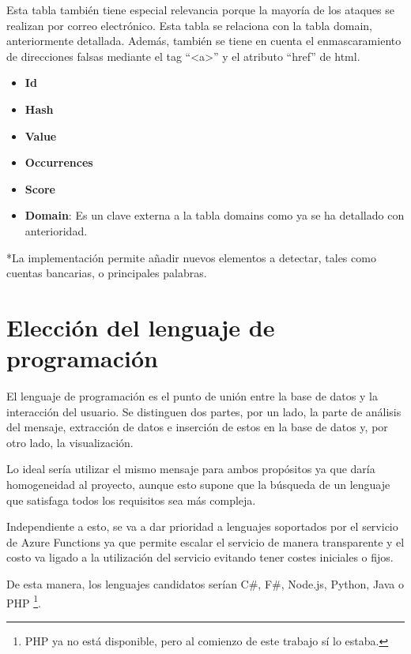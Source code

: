 \begin{itemize}
Esta tabla también tiene especial relevancia porque la mayoría de los ataques se realizan por correo electrónico. Esta tabla se relaciona con la tabla domain, anteriormente detallada. Además, también se tiene en cuenta el enmascaramiento de direcciones falsas mediante el tag “<a>” y el atributo “href” de html.
\begin{itemize}
    \item \textbf{Id}
    \item \textbf{Hash}
    \item \textbf{Value}
    \item \textbf{Occurrences}
    \item \textbf{Score}
    \item \textbf{Domain}: Es un clave externa a la tabla domains como ya se ha detallado con anterioridad.
\end{itemize}

\end{itemize}
*La implementación permite añadir nuevos elementos a detectar, tales como cuentas bancarias, o principales palabras.

\section{Elección del lenguaje de programación}
El lenguaje de programación es el punto de unión entre la base de datos y la interacción del usuario. Se distinguen dos partes, por un lado, la parte de análisis del mensaje, extracción de datos e inserción de estos en la base de datos y, por otro lado, la visualización.

Lo ideal sería utilizar el mismo mensaje para ambos propósitos ya que daría homogeneidad al proyecto, aunque esto supone que la búsqueda de un lenguaje que satisfaga todos los requisitos sea más compleja.

Independiente a esto, se va a dar prioridad a lenguajes soportados por el servicio de Azure Functions ya que permite escalar el servicio de manera transparente y el costo va ligado a la utilización del servicio evitando tener costes iniciales o fijos.

De esta manera, los lenguajes candidatos serían C\#, F\#, Node.js, Python, Java o PHP \footnote{PHP ya no está disponible, pero al comienzo de este trabajo sí lo estaba.}.

